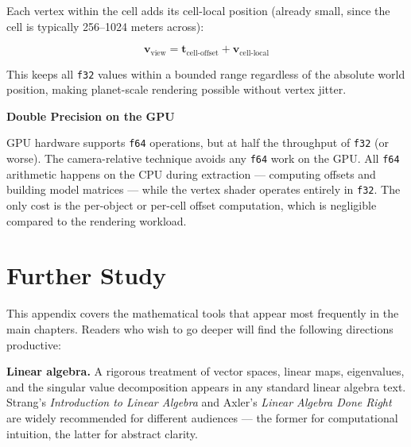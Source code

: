 \documentclass[
  11pt,
  letterpaper,
  DIV=11,
  numbers=noendperiod,
  twoside,
  open=right]{scrreprt}
\begin{document}
Each vertex within the cell adds its cell-local position (already small,
since the cell is typically 256--1024 meters across):

\[
\mathbf{v}_{\text{view}} = \mathbf{t}_{\text{cell-offset}} + \mathbf{v}_{\text{cell-local}}
\]

This keeps all \texttt{f32} values within a bounded range regardless of
the absolute world position, making planet-scale rendering possible
without vertex jitter.

\begin{tcolorbox}[enhanced jigsaw, arc=.35mm, bottomrule=.15mm, breakable, colback=white, colframe=quarto-callout-note-color-frame, left=2mm, leftrule=.75mm, opacityback=0, rightrule=.15mm, toprule=.15mm]
\begin{minipage}[t]{5.5mm}
\textcolor{quarto-callout-note-color}{\faInfo}
\end{minipage}%
\begin{minipage}[t]{\textwidth - 5.5mm}

\vspace{-3mm}\textbf{Double Precision on the GPU}\vspace{3mm}

GPU hardware supports \texttt{f64} operations, but at half the
throughput of \texttt{f32} (or worse). The camera-relative technique
avoids any \texttt{f64} work on the GPU. All \texttt{f64} arithmetic
happens on the CPU during extraction --- computing offsets and building
model matrices --- while the vertex shader operates entirely in
\texttt{f32}. The only cost is the per-object or per-cell offset
computation, which is negligible compared to the rendering workload.

\end{minipage}%
\end{tcolorbox}

\section{Further Study}\label{further-study}

This appendix covers the mathematical tools that appear most frequently
in the main chapters. Readers who wish to go deeper will find the
following directions productive:

\textbf{Linear algebra.} A rigorous treatment of vector spaces, linear
maps, eigenvalues, and the singular value decomposition appears in any
standard linear algebra text. Strang's \emph{Introduction to Linear
Algebra} and Axler's \emph{Linear Algebra Done Right} are widely
recommended for different audiences --- the former for computational
intuition, the latter for abstract clarity.
\end{document}
